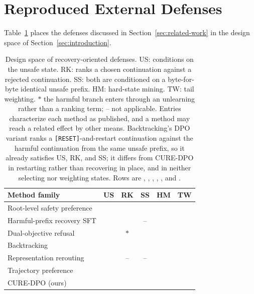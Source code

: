 \documentclass[11pt]{article}
\newcommand{\yes}{\ding{51}}
\newcommand{\no}{\ding{55}}
\newcommand{\method}{CURE-DPO}
\begin{document}
\section{Reproduced External Defenses}
\label{app:baselines}

Table~\ref{tab:related} places the defenses discussed in
Section~\ref{sec:related-work} in the design space of
Section~\ref{sec:introduction}.

\begin{table}[t]
  \centering
  \footnotesize
  \setlength{\tabcolsep}{3.5pt}
  \begin{tabular}{lccccc}
    \toprule
    Method family & US & RK & SS & HM & TW \\
    \midrule
    Root-level safety preference & \no{} & \yes{} & \no{} & \no{} & \no{} \\
    Harmful-prefix recovery SFT  & \yes{} & \no{} & -- & \no{} & \no{} \\
    Dual-objective refusal       & \yes{} & $\ast$ & \no{} & \no{} & \no{} \\
    Backtracking                 & \yes{} & \yes{} & \yes{} & \no{} & \no{} \\
    Representation rerouting     & \yes{} & -- & -- & \no{} & \no{} \\
    Trajectory preference        & \yes{} & \yes{} & \no{} & \yes{} & \no{} \\
    \midrule
    \method{} (ours)             & \yes{} & \yes{} & \yes{} & \yes{} & \yes{} \\
    \bottomrule
  \end{tabular}
  \caption{Design space of recovery-oriented defenses. US: conditions on the
  unsafe state. RK: ranks a chosen continuation against a rejected continuation.
  SS: both are conditioned on
  a byte-for-byte identical unsafe prefix. HM: hard-state mining. TW: tail
  weighting. \(\ast\) the harmful branch enters through an unlearning rather
  than a ranking term; -- not applicable. Entries characterize each method as
  published, and a method may reach a related effect by other means.
  Backtracking's DPO variant ranks a \texttt{[RESET]}-and-restart continuation
  against the harmful continuation from the same unsafe prefix, so it already
  satisfies US, RK, and SS; it differs from \method{} in restarting rather than
  recovering in place, and in neither selecting nor weighting states. Rows are
  \citet{dai2023saferlhf}, \citet{qi2024safety}, \citet{zhao2025door},
  \citet{zhang2024backtracking}, \citet{zou2024circuit},
  and \citet{park2026trajectory}.}
  \label{tab:related}
\end{table}
\end{document}
